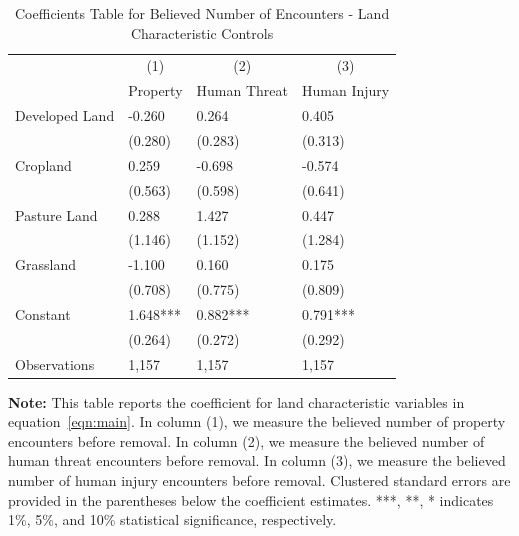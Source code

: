 \documentclass[english,12pt]{article}
\begin{document}
\begin{table}[H]
    \centering
    \caption{Coefficients Table for Believed Number of Encounters - Land Characteristic Controls}
    \footnotesize
    \begin{tabular}{@{}llll@{}}
        \toprule
                           &\multicolumn{1}{c}{(1)}   &\multicolumn{1}{c}{(2)}   &\multicolumn{1}{c}{(3)}  \\
                           & Property & Human Threat & Human Injury \\ \midrule
        Developed Land&      -0.260   &       0.264   &       0.405   \\
                    &     (0.280)   &     (0.283)   &     (0.313)   \\
        Cropland    &       0.259   &      -0.698   &      -0.574   \\
                    &     (0.563)   &     (0.598)   &     (0.641)   \\
        Pasture Land&       0.288   &       1.427   &       0.447   \\
                    &     (1.146)   &     (1.152)   &     (1.284)   \\
        Grassland   &      -1.100   &       0.160   &       0.175   \\
                    &     (0.708)   &     (0.775)   &     (0.809)   \\\midrule                       
        Constant    &       1.648***&       0.882***&       0.791***\\
                    &     (0.264)   &     (0.272)   &     (0.292)   \\
        Observations & 1,157    &  1,157       & 1,157        \\\bottomrule
    \end{tabular}
    \begin{minipage}{.9\textwidth}
        \vspace{1em}
    \footnotesize{{\bf{Note:}} This table reports the coefficient for land characteristic variables in equation~\ref{eqn:main}. In column (1), we measure the believed number of property encounters before removal. In column (2), we measure the believed number of human threat encounters before removal. In column (3), we measure the believed number of human injury encounters before removal. Clustered standard errors are provided in the parentheses below the coefficient estimates. ***, **, * indicates 1\%, 5\%, and 10\% statistical significance, respectively.}
    \label{tab: bel_land}
    \end{minipage}
\end{table}
\end{document}
